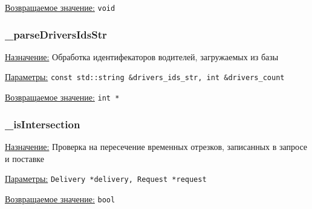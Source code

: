 \underline{Возвращаемое значение:} \verb|void|


\subsubsection{\_parseDriversIdsStr}

\underline{Назначение:}
Обработка идентифекаторов водителей, загружаемых из базы

\underline{Параметры:} \verb|const std::string &drivers_ids_str, int &drivers_count|

\underline{Возвращаемое значение:} \verb|int *|


\subsubsection{\_isIntersection}

\underline{Назначение:}
Проверка на пересечение временных отрезков, 
записанных в запросе и поставке

\underline{Параметры:} \verb|Delivery *delivery, Request *request|

\underline{Возвращаемое значение:} \verb|bool|

